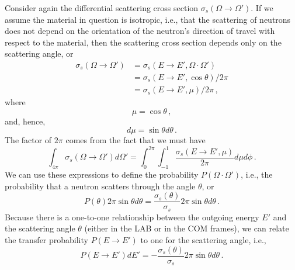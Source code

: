 Consider again the differential scattering cross section
$\sigma_s(\Omega \to \Omega')$.
If we assume the material in question is isotropic, i.e., that the 
scattering of neutrons does not depend on the orientation of 
the neutron's direction of travel with respect to the material,
then the scattering cross section depends only on the scattering 
angle, or 
\begin{equation}
\begin{split}
 \sigma_s(\Omega \to \Omega') &= \sigma_s(E\to E', \Omega\cdot \Omega') \\
                              &= \sigma_s(E\to E', \cos\theta)/2\pi \\
                              &= \sigma_s(E\to E', \mu)/2\pi \, ,
\end{split}
\end{equation}
where
\begin{equation}
 \mu = \cos\theta \, ,
\end{equation}
and, hence,
\begin{equation}
 d\mu = \sin\theta d\theta \, .
\end{equation}
The factor of $2\pi$ comes from the fact that we must have
\begin{equation}
 \int_{4\pi} \sigma_s(\Omega \to \Omega')  d\Omega'
   = \int^{2\pi}_0 \int^{1}_{-1}\frac{\sigma_s(E\to E', \mu)}{2\pi}
     d\mu d\phi \, .
\end{equation}
We can use these expressions to define the probability 
$P(\Omega\cdot \Omega')$, i.e., the probability that 
a neutron scatters through the angle $\theta$, or
\begin{equation}
 P(\theta) 2\pi \sin \theta d\theta = \frac{\sigma_s(\theta)}{\sigma_s}  2\pi \sin \theta d\theta \, .
\end{equation}
Because there is a one-to-one relationship between the outgoing 
energy $E'$ and the scattering angle $\theta$ (either in the LAB or 
in the COM frames), we can relate
the transfer probability $P(E\to E')$ to one for the scattering angle, 
i.e.,
\begin{equation}
 P(E\to E') dE' = - \frac{\sigma_s(\theta)}{\sigma_s} 2\pi \sin \theta d\theta \, .
\end{equation}

